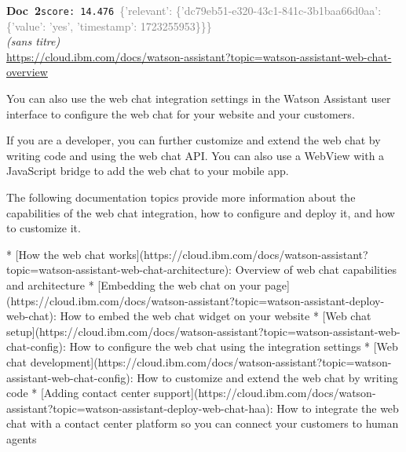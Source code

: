 \documentclass[a4paper,11pt]{article}
\begin{document}
\begin{docenv}
{\footnotesize\textcolor{doccolor}{\textbf{Doc~2}}}\hfill{\tiny\texttt{score:~14.476}}\ {\tiny\textcolor{gray}{\{'relevant': \{'dc79eb51-e320-43c1-841c-3b1baa66d0aa': \{'value': 'yes', 'timestamp': 1723255953\}\}\}}}\\[3pt]
{\small\textit{(sans titre)}}\\[2pt]
{\tiny\url{https://cloud.ibm.com/docs/watson-assistant?topic=watson-assistant-web-chat-overview}}\\[4pt]
{\footnotesize 
You can also use the web chat integration settings in the Watson Assistant user interface to configure the web chat for your website and your customers.

If you are a developer, you can further customize and extend the web chat by writing code and using the web chat API. You can also use a WebView with a JavaScript bridge to add the web chat to your mobile app.

The following documentation topics provide more information about the capabilities of the web chat integration, how to configure and deploy it, and how to customize it.



* [How the web chat works](https://cloud.ibm.com/docs/watson-assistant?topic=watson-assistant-web-chat-architecture): Overview of web chat capabilities and architecture
* [Embedding the web chat on your page](https://cloud.ibm.com/docs/watson-assistant?topic=watson-assistant-deploy-web-chat): How to embed the web chat widget on your website
* [Web chat setup](https://cloud.ibm.com/docs/watson-assistant?topic=watson-assistant-web-chat-config): How to configure the web chat using the integration settings
* [Web chat development](https://cloud.ibm.com/docs/watson-assistant?topic=watson-assistant-web-chat-config): How to customize and extend the web chat by writing code
* [Adding contact center support](https://cloud.ibm.com/docs/watson-assistant?topic=watson-assistant-deploy-web-chat-haa): How to integrate the web chat with a contact center platform so you can connect your customers to human agents}
\end{docenv}
\end{document}
